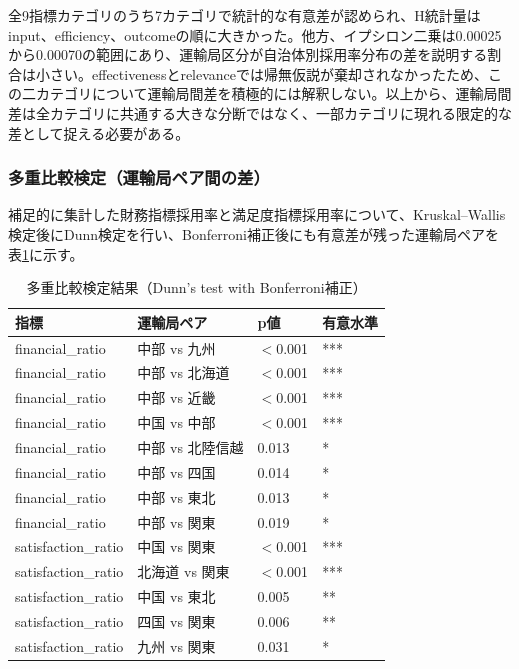 全9指標カテゴリのうち7カテゴリで統計的な有意差が認められ、H統計量はinput、efficiency、outcomeの順に大きかった。他方、イプシロン二乗は0.00025から0.00070の範囲にあり、運輸局区分が自治体別採用率分布の差を説明する割合は小さい。effectivenessとrelevanceでは帰無仮説が棄却されなかったため、この二カテゴリについて運輸局間差を積極的には解釈しない。以上から、運輸局間差は全カテゴリに共通する大きな分断ではなく、一部カテゴリに現れる限定的な差として捉える必要がある。

\subsubsection{多重比較検定（運輸局ペア間の差）}

補足的に集計した財務指標採用率と満足度指標採用率について、Kruskal--Wallis検定後にDunn検定を行い、Bonferroni補正後にも有意差が残った運輸局ペアを表\ref{tab:dunn_test}に示す。

\begin{table}[htbp]
\caption{多重比較検定結果（Dunn's test with Bonferroni補正）}
\label{tab:dunn_test}
\centering
\scriptsize
\begin{tabular}{llll}
\toprule
指標 & 運輸局ペア & p値 & 有意水準 \\
\midrule
financial\_ratio & 中部 vs 九州 & $<$0.001 & *** \\
financial\_ratio & 中部 vs 北海道 & $<$0.001 & *** \\
financial\_ratio & 中部 vs 近畿 & $<$0.001 & *** \\
financial\_ratio & 中国 vs 中部 & $<$0.001 & *** \\
financial\_ratio & 中部 vs 北陸信越 & 0.013 & * \\
financial\_ratio & 中部 vs 四国 & 0.014 & * \\
financial\_ratio & 中部 vs 東北 & 0.013 & * \\
financial\_ratio & 中部 vs 関東 & 0.019 & * \\
satisfaction\_ratio & 中国 vs 関東 & $<$0.001 & *** \\
satisfaction\_ratio & 北海道 vs 関東 & $<$0.001 & *** \\
satisfaction\_ratio & 中国 vs 東北 & 0.005 & ** \\
satisfaction\_ratio & 四国 vs 関東 & 0.006 & ** \\
satisfaction\_ratio & 九州 vs 関東 & 0.031 & * \\
\bottomrule
\end{tabular}
\end{table}

